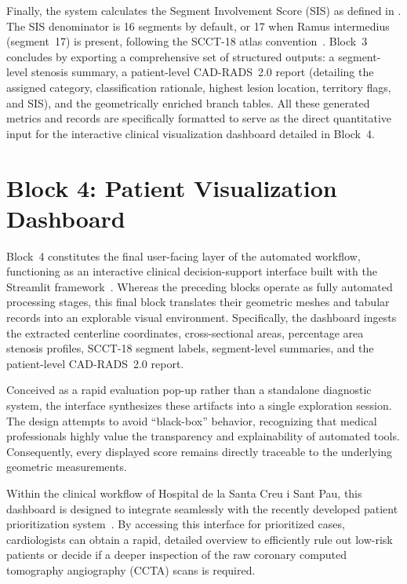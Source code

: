 Finally, the system calculates the Segment Involvement Score (SIS) as defined in . The SIS denominator is 16 segments by default, or 17 when Ramus intermedius (segment~17) is present, following the SCCT-18 atlas convention~\cite{leipsic2014,cury2022}. Block~3 concludes by exporting a comprehensive set of structured outputs: a segment-level stenosis summary, a patient-level CAD-RADS~2.0 report (detailing the assigned category, classification rationale, highest lesion location, territory flags, and SIS), and the geometrically enriched branch tables. All these generated metrics and records are specifically formatted to serve as the direct quantitative input for the interactive clinical visualization dashboard detailed in Block~4.

\section{Block 4: Patient Visualization Dashboard}
\label{sec:methodology-block4}

Block~4 constitutes the final user-facing layer of the automated workflow, functioning as an interactive clinical decision-support interface built with the Streamlit framework~\cite{streamlit}. Whereas the preceding blocks operate as fully automated processing stages, this final block translates their geometric meshes and tabular records into an explorable visual environment. Specifically, the dashboard ingests the extracted centerline coordinates, cross-sectional areas, percentage area stenosis profiles, SCCT-18 segment labels, segment-level summaries, and the patient-level CAD-RADS~2.0 report.

Conceived as a rapid evaluation pop-up rather than a standalone diagnostic system, the interface synthesizes these artifacts into a single exploration session. The design attempts to avoid ``black-box'' behavior, recognizing that medical professionals highly value the transparency and explainability of automated tools. Consequently, every displayed score remains directly traceable to the underlying geometric measurements.

Within the clinical workflow of Hospital de la Santa Creu i Sant Pau, this dashboard is designed to integrate seamlessly with the recently developed patient prioritization system~\cite{ferrer2024}. By accessing this interface for prioritized cases, cardiologists can obtain a rapid, detailed overview to efficiently rule out low-risk patients or decide if a deeper inspection of the raw coronary computed tomography angiography (CCTA) scans is required.

